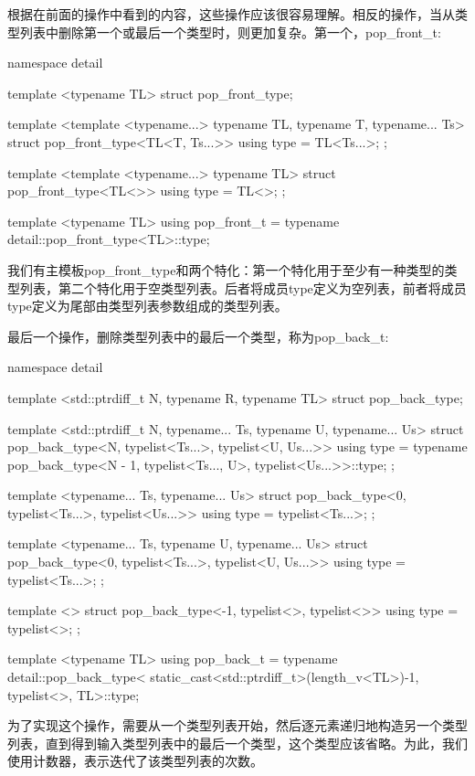 根据在前面的操作中看到的内容，这些操作应该很容易理解。相反的操作，当从类型列表中删除第一个或最后一个类型时，则更加复杂。第一个，pop_front_t:

\begin{cppcode}
namespace detail
{
	template <typename TL>
	struct pop_front_type;
	
	template <template <typename...> typename TL,
	          typename T, typename... Ts>
	struct pop_front_type<TL<T, Ts...>>
	{
		using type = TL<Ts...>;
	};

	template <template <typename...> typename TL>
	struct pop_front_type<TL<>>
	{
		using type = TL<>;
	};
}

template <typename TL>
using pop_front_t =
	typename detail::pop_front_type<TL>::type;
\end{cppcode}

我们有主模板pop_front_type和两个特化：第一个特化用于至少有一种类型的类型列表，第二个特化用于空类型列表。后者将成员type定义为空列表，前者将成员type定义为尾部由类型列表参数组成的类型列表。

最后一个操作，删除类型列表中的最后一个类型，称为pop_back_t:

\begin{cppcode}
namespace detail
{
	template <std::ptrdiff_t N, typename R, typename TL>
	struct pop_back_type;
	
	template <std::ptrdiff_t N, typename... Ts,
			  typename U, typename... Us>
	struct pop_back_type<N, typelist<Ts...>,
							typelist<U, Us...>>
	{
		using type =
			typename pop_back_type<N - 1,
									typelist<Ts..., U>,
									typelist<Us...>>::type;
	};

	template <typename... Ts, typename... Us>
	struct pop_back_type<0, typelist<Ts...>,
							typelist<Us...>>
	{
		using type = typelist<Ts...>;
	};

	template <typename... Ts, typename U, typename... Us>
	struct pop_back_type<0, typelist<Ts...>,
							typelist<U, Us...>>
	{
		using type = typelist<Ts...>;
	};

	template <>
	struct pop_back_type<-1, typelist<>, typelist<>>
	{
		using type = typelist<>;
	};
}

template <typename TL>
using pop_back_t = typename detail::pop_back_type<
	static_cast<std::ptrdiff_t>(length_v<TL>)-1,
				typelist<>, TL>::type;
\end{cppcode}

为了实现这个操作，需要从一个类型列表开始，然后逐元素递归地构造另一个类型列表，直到得到输入类型列表中的最后一个类型，这个类型应该省略。为此，我们使用计数器，表示迭代了该类型列表的次数。

